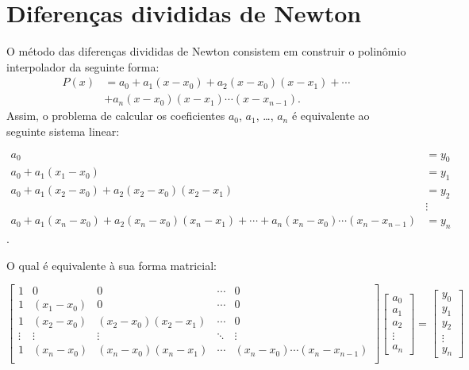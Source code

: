 \section{Diferenças divididas de Newton}
O método das diferenças divididas de Newton consistem em construir o polinômio interpolador da seguinte forma:
\begin{align*}
P(x) &= a_0 + a_1 (x-x_0) + a_2 (x-x_0)(x-x_1) + \cdots \\
&+ a_n (x-x_0)(x-x_1)\cdots (x-x_{n-1}).
\end{align*}
Assim, o problema de calcular os coeficientes $a_0$, $a_1$, \ldots, $a_n$ é equivalente ao seguinte sistema linear:
\begin{small}
\begin{align*}
a_0 &= y_0\\
a_0+a_1(x_1-x_0) &= y_1\\
a_0+a_1(x_2-x_0)+a_2(x_2-x_0)(x_2-x_1) &= y_2\\
&\vdots\\
a_0+a_1(x_n-x_0)+a_2(x_n-x_0)(x_n-x_1)+\cdots + a_n(x_n-x_0)\cdots (x_n-x_{n-1})
 &= y_n
\end{align*}.  
\end{small}
O qual é equivalente à sua forma matricial:
\begin{small}
  \begin{equation*}
    \begin{bmatrix}
      1 & 0 & 0  & \!\cdots\!&0\\
      1& (x_1-x_0)&0 &\!\cdots\!&0\\
      1&(x_2-x_0)&(x_2-x_0)(x_2-x_1) &\!\cdots\!&0\\
      \vdots&\vdots&\vdots&\!\ddots\!&\vdots\\
      1&(x_n-x_0)&(x_n-x_0)(x_n-x_1) &\!\cdots\!& (x_{n}-x_0)\cdots(x_n-x_{n-1})\\
    \end{bmatrix}\begin{bmatrix}
      a_0\\a_1\\a_2\\ \vdots \\a_n
    \end{bmatrix} = 
    \begin{bmatrix}
      y_0\\y_1\\y_2\\ \vdots \\y_n
    \end{bmatrix}
  \end{equation*}
\end{small}

